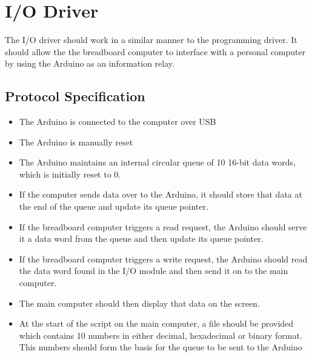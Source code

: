 \section{I/O Driver}
The I/O driver should work in a similar manner to the programming driver. It should allow the
the breadboard computer to interface with a personal computer by using the Arduino as an
information relay.

\subsection{Protocol Specification}
\begin{itemize}
  \item The Arduino is connected to the computer over USB
  \item The Arduino is manually reset
  \item The Arduino maintains an internal circular queue of 10 16-bit data words, which is
  initially reset to 0.
  \item If the computer sends data over to the Arduino, it should store that data at the end of
  the queue and update its queue pointer.
  \item If the breadboard computer triggers a read request, the Arduino should serve it a data
  word from the queue and then update its queue pointer.
  \item If the breadboard computer triggers a write request, the Arduino should read the data word
  found in the I/O module and then send it on to the main computer.
  \item The main computer should then display that data on the screen.
  \item At the start of the script on the main computer, a file should be provided which
  contains 10 numbers in either decimal, hexadecimal or binary format. This numbers should
  form the basis for the queue to be sent to the Arduino
\end{itemize}
